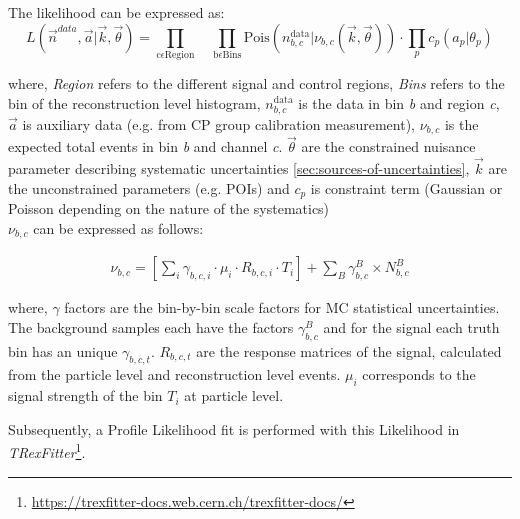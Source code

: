 The likelihood can be expressed as:
\begin{equation}\label{eq:likelihodd-defn}
	L(\vec{n}^{data},\vec{a} | \vec{k}, \vec{\theta}) = \prod_{\mathrm{c} \epsilon \mathrm{Region}} \quad \prod_{\mathrm{b} \epsilon \mathrm{Bins}} \mathrm{Pois} (n^{\mathrm{data}}_{b,c}|\nu_{b,c}(\vec{k}, \Vec{\theta})) \cdot \prod_{p} c_p(a_p|\theta_{p})
\end{equation}

where, \textit{Region} refers to the different signal and control regions, \textit{Bins} refers to the bin of the reconstruction level histogram, $n^{\mathrm{data}}_{b,c}$ is the data in bin \textit{b} and  region \textit{c}, $\vec{a}$ is auxiliary data (e.g. from CP group calibration measurement), $\nu_{b,c}$ is the expected total events in bin \textit{b} and channel \textit{c}. $\Vec{\theta}$ are the constrained nuisance parameter describing systematic uncertainties \cref{sec:sources-of-uncertainties}, $\vec{k}$ are the unconstrained parameters (e.g. POIs) and $c_p$ is constraint term (Gaussian or Poisson depending on the nature of the systematics)\\

$\nu_{b,c}$ can be expressed as follows:

\begin{align}\label{eq:likelihodd-defn-1}
    \nu_{b,c} = \left[\sum_i \gamma_{b,c,i} \cdot \mu_{i} \cdot R_{b,c,i} \cdot T_{i}\right] + \sum_{B} \gamma_{b,c}^{B} \times N_{b,c}^{B} 
\end{align}

where, $\gamma$ factors are the bin-by-bin scale factors for MC statistical uncertainties. The background samples each have the factors $\gamma_{b,c}^{B}$ and for the signal each truth bin has an unique $\gamma_{b,c,t}$. $R_{b,c,t}$ are the response matrices of the signal, calculated from the particle level and reconstruction level events. $\mu_{i}$ corresponds to the signal strength of the bin $T_{i}$ at particle level.

Subsequently, a Profile Likelihood fit is performed with this Likelihood in \emph{TRexFitter}\footnote{\url{https://trexfitter-docs.web.cern.ch/trexfitter-docs/}}.



